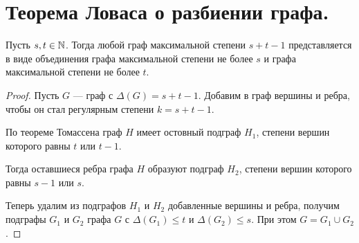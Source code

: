 \section{Теорема Ловаса о разбиении графа.}
\begin{corollary}[Ловас, 1970]
    Пусть $s, t \in \mathbb{N}$. Тогда любой граф максимальной степени $s+t-1$ представляется в виде объединения  графа максимальной степени не более $s$ и графа максимальной степени не более $t$.
\end{corollary}
\begin{proof}
    Пусть $G$ --- граф с $\Delta(G) = s+t-1$. Добавим в граф вершины и ребра, чтобы он стал регулярным степени $k=s+t-1$.

	По теореме Томассена граф  $H$ имеет остовный подграф $H_1$, степени вершин которого равны $t$ или $t-1$.

	Тогда оставшиеся ребра графа $H$ образуют подграф $H_2$, степени вершин которого равны $s-1$ или $s$.

	Теперь удалим из подграфов $H_1$ и $H_2$ добавленные вершины и ребра, получим подграфы $G_1$ и $G_2$ графа $G$ с $\Delta(G_1) \le t$ и $\Delta(G_2) \le s$. При этом $G = G_1 \cup G_2$.
\end{proof}

